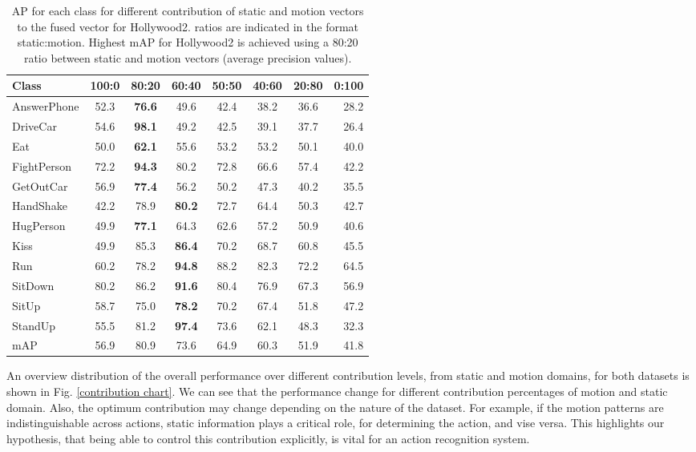\begin{table*}[]
\centering
\caption{AP for each class for different contribution of static and motion vectors to the fused vector for Hollywood2. ratios are indicated in the
format static:motion. Highest mAP for Hollywood2 is achieved using a
80:20 ratio between static and motion vectors (average precision values).}\label{tbl:rho hollywood2}
\begin{tabular}{@{} l c c c c c c r @{} }
\toprule
Class           & 100:0 & 80:20 & 60:40 & 50:50 & 40:60 & 20:80 & 0:100 \\ \midrule \midrule
AnswerPhone     & 52.3& \textbf{76.6}& 49.6& 42.4& 38.2& 36.6& 28.2        \\
DriveCar        & 54.6& \textbf{98.1}& 49.2& 42.5& 39.1& 37.7& 26.4            \\
Eat             & 50.0& \textbf{62.1}& 55.6& 53.2& 53.2& 50.1& 40.0           \\
FightPerson     & 72.2& \textbf{94.3}& 80.2& 72.8& 66.6& 57.4& 42.2  \\
GetOutCar       & 56.9& \textbf{77.4}& 56.2& 50.2& 47.3& 40.2& 35.5\\
HandShake       & 42.2& 78.9& \textbf{80.2}& 72.7& 64.4& 50.3& 42.7 \\
HugPerson       & 49.9& \textbf{77.1}& 64.3& 62.6& 57.2& 50.9& 40.6 \\
Kiss            & 49.9& 85.3& \textbf{86.4}& 70.2& 68.7& 60.8& 45.5 \\
Run             & 60.2& 78.2& \textbf{94.8}& 88.2& 82.3& 72.2& 64.5  \\
SitDown         & 80.2& 86.2& \textbf{91.6}& 80.4& 76.9& 67.3& 56.9  \\
SitUp           & 58.7& 75.0& \textbf{78.2}& 70.2& 67.4& 51.8& 47.2 \\
StandUp         & 55.5& 81.2& \textbf{97.4}& 73.6& 62.1& 48.3& 32.3 \\ \midrule
mAP             & 56.9& 80.9   &  73.6    &  64.9   &    60.3   &   51.9    &  41.8\\ \bottomrule

\end{tabular}
\end{table*}

An overview distribution of the overall performance over different contribution levels, from static and motion domains, for both datasets is shown in Fig. \ref{contribution chart}.
We can see that the performance change for different contribution percentages of motion and static domain. Also, the optimum contribution may change
depending on the nature of the dataset. For example, if the motion patterns are indistinguishable across actions, static information plays
a critical role, for determining the action, and vise versa. This highlights
our hypothesis, that being able to control this contribution explicitly, is vital for an action recognition system.


